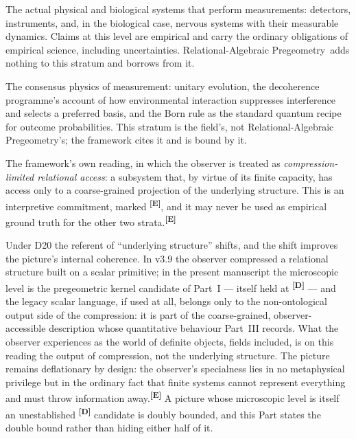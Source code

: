 \documentclass[12pt,a4paper,twoside]{article}
\theoremstyle{plain}
\theoremstyle{definition}
\theoremstyle{remark}
\newcommand{\ProjectShort}{Relational-Algebraic Pregeometry}
\newcommand{\RAP}{\ProjectShort}
\newcommand{\catmark}[1]{\textsuperscript{\textsf{\textbf{[#1]}}}}
\begin{document}
\begin{description}[leftmargin=1.4em,style=nextline]
\item[Stratum~I: Empirical observer systems.] The actual physical and
biological systems that perform measurements: detectors, instruments,
and, in the biological case, nervous systems with their measurable
dynamics. Claims at this level are empirical and carry the ordinary
obligations of empirical science, including uncertainties. \RAP\ adds
nothing to this stratum and borrows from it.
\item[Stratum~II: Standard quantum and decoherence formalism.] The
consensus physics of measurement: unitary evolution, the decoherence
programme's account of how environmental interaction suppresses
interference and selects a preferred basis, and the Born rule as the
standard quantum recipe for outcome probabilities. This stratum is the
field's, not \RAP's; the framework cites it and is bound by it.
\item[Stratum~III: The \RAP\ interpretation.] The framework's own
reading, in which the observer is treated as \emph{compression-limited
relational access}: a subsystem that, by virtue of its finite capacity,
has access only to a coarse-grained projection of the underlying
structure. This is an interpretive commitment, marked \catmark{E}, and
it may never be used as empirical ground truth for the other two
strata.\catmark{E}
\end{description}

\noindent Under D20 the referent of ``underlying structure'' shifts, and
the shift improves the picture's internal coherence. In v3.9 the
observer compressed a relational structure built on a scalar primitive; in
the present manuscript the microscopic level is the pregeometric
kernel candidate of Part~I --- itself held at \catmark{D} --- and the
legacy scalar language, if used at all, belongs only to the non-ontological output side of
the compression: it is part of the coarse-grained, observer-accessible
description whose quantitative behaviour Part~III records. What the
observer experiences as the world of definite objects, fields included,
is on this reading the output of compression, not the underlying
structure. The picture remains deflationary by design: the observer's
specialness lies in no metaphysical privilege but in the ordinary fact
that finite systems cannot represent everything and must throw
information away.\catmark{E} A picture whose microscopic level is itself
an unestablished \catmark{D} candidate is doubly bounded, and this Part
states the double bound rather than hiding either half of it.
\end{document}
